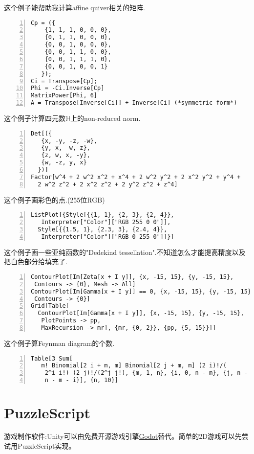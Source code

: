 \documentclass[11pt]{amsart}
\begin{document}
这个例子能帮助我计算affine quiver相关的矩阵.
\begin{lstlisting}[numbers=left,numberstyle=\tiny,numbersep=10pt]
Cp = ({
    {1, 1, 1, 0, 0, 0},
    {0, 1, 1, 0, 0, 0},
    {0, 0, 1, 0, 0, 0},
    {0, 0, 1, 1, 0, 0},
    {0, 0, 1, 1, 1, 0},
    {0, 0, 1, 0, 0, 1}
   });
Ci = Transpose[Cp];
Phi = -Ci.Inverse[Cp]
MatrixPower[Phi, 6]
A = Transpose[Inverse[Ci]] + Inverse[Ci] (*symmetric form*)
\end{lstlisting}
这个例子计算四元数$\mathbb{H}$上的non-reduced norm.
\begin{lstlisting}[numbers=left,numberstyle=\tiny,numbersep=10pt]
Det[({
   {x, -y, -z, -w},
   {y, x, -w, z},
   {z, w, x, -y},
   {w, -z, y, x}
  })]
Factor[w^4 + 2 w^2 x^2 + x^4 + 2 w^2 y^2 + 2 x^2 y^2 + y^4 + 
  2 w^2 z^2 + 2 x^2 z^2 + 2 y^2 z^2 + z^4]
\end{lstlisting}
这个例子画彩色的点.(255位RGB)
\begin{lstlisting}[numbers=left,numberstyle=\tiny,numbersep=10pt]
ListPlot[{Style[{{1, 1}, {2, 3}, {2, 4}}, 
   Interpreter["Color"]["RGB 255 0 0"]], 
  Style[{{1.5, 1}, {2.3, 3}, {2.4, 4}}, 
   Interpreter["Color"]["RGB 0 255 0"]]}]
\end{lstlisting}
这个例子画一些亚纯函数的"Dedekind tessellation".不知道怎么才能提高精度以及把白色部分给填充了.
\begin{lstlisting}[numbers=left,numberstyle=\tiny,numbersep=10pt]
ContourPlot[Im[Zeta[x + I y]], {x, -15, 15}, {y, -15, 15}, 
 Contours -> {0}, Mesh -> All]
ContourPlot[Im[Gamma[x + I y]] == 0, {x, -15, 15}, {y, -15, 15}, 
 Contours -> {0}]
Grid[Table[
  ContourPlot[Im[Gamma[x + I y]], {x, -15, 15}, {y, -15, 15}, 
   PlotPoints -> pp, 
   MaxRecursion -> mr], {mr, {0, 2}}, {pp, {5, 15}}]]
\end{lstlisting}
这个例子算Feynman diagram的个数.
\begin{lstlisting}[numbers=left,numberstyle=\tiny,numbersep=10pt]
Table[3 Sum[
   m! Binomial[2 i + m, m] Binomial[2 j + m, m] (2 i)!/(
    2^i i!) (2 j)!/(2^j j!), {m, 1, n}, {i, 0, n - m}, {j, n - m - i, 
    n - m - i}], {n, 10}]
\end{lstlisting}
\section{PuzzleScript}
游戏制作软件:Unity可以由免费开源游戏引擎\href{https://docs.godotengine.org/zh_CN/stable/index.html}{Godot}替代。简单的2D游戏可以先尝试用PuzzleScript实现。
\end{document}
